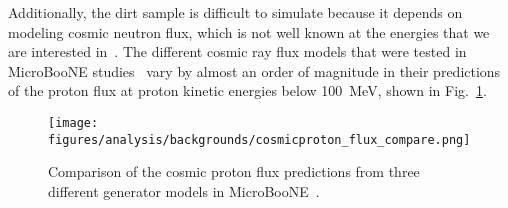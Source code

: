     Additionally, the dirt sample is difficult to simulate because it depends
    on modeling cosmic neutron flux, which is not well known at the energies
    that we are interested in~\cite{Bhadra:2009fw}. The different cosmic ray
    flux models that were tested in MicroBooNE studies~\cite{uBCosmicNote} vary
    by almost an order of magnitude in their predictions of the proton flux at
    proton kinetic energies below 100~MeV, shown in Fig.~\ref{fig:cosmicpflux}.
    \begin{figure}[ht]
      \centering
      \texttt{[image: figures/analysis/backgrounds/cosmicproton\_flux\_compare.png]}
      \caption{Comparison of the cosmic proton flux predictions from three
        different generator models in MicroBooNE~\cite{uBCosmicNote}.}
      \label{fig:cosmicpflux}
    \end{figure}


